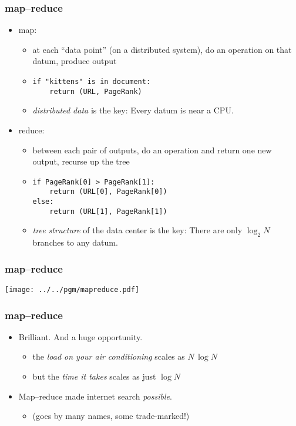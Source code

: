 \documentclass[pdftex]{beamer}
\begin{document}
\begin{frame}
  \frametitle{map--reduce}
  \begin{itemize}
  \item map:
    \begin{itemize}
    \item at each ``data point'' (on a distributed system), do an
      operation on that datum, produce output
    \item \texttt{if "kittens" is in document: \\ ~~~~return (URL, PageRank)}
    \item \emph{distributed data} is the key: Every datum is near a
      CPU.
    \end{itemize}
  \item reduce:
    \begin{itemize}
    \item between each pair of outputs, do an operation and return one
      new output, recurse up the tree
    \item \texttt{if PageRank[0] > PageRank[1]: \\ ~~~~return (URL[0], PageRank[0]) \\ else: \\ ~~~~return (URL[1], PageRank[1])}
    \item \emph{tree structure} of the data center is the key: There are only
      $\log_2 N$ branches to any datum.
    \end{itemize}
  \end{itemize}
\end{frame}

\begin{frame}
  \frametitle{map--reduce}
  \texttt{[image: ../../pgm/mapreduce.pdf]}
\end{frame}

\begin{frame}
  \frametitle{map--reduce}
  \begin{itemize}
  \item Brilliant.  And a huge opportunity.
    \begin{itemize}
    \item the \emph{load on your air conditioning} scales as $N\,\log N$
    \item but the \emph{time it takes} scales as just $\log N$
    \end{itemize}
  \item Map--reduce made internet search \emph{possible}.
    \begin{itemize}
    \item (goes by many names, some trade-marked!)
    \end{itemize}
  \end{itemize}
\end{frame}
\end{document}
